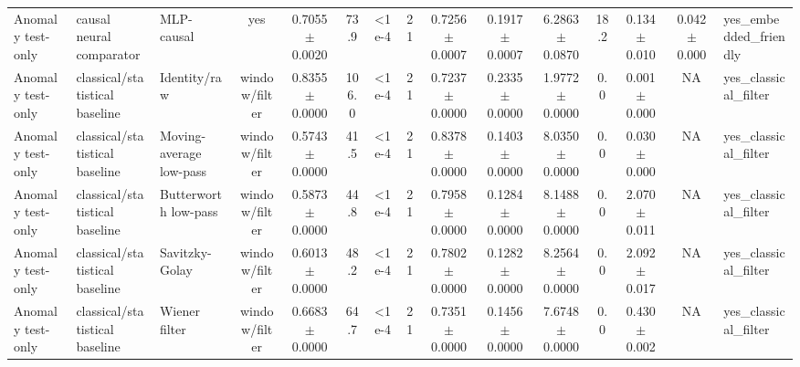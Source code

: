 \begin{table}[t]
{\begin{tabular}{lllcccccccccccl}
Anomaly test-only & causal neural comparator & MLP-causal & yes & 0.7055 $\pm$ 0.0020 & 73.9 & <1e-4 & 21 & 0.7256 $\pm$ 0.0007 & 0.1917 $\pm$ 0.0007 & 6.2863 $\pm$ 0.0870 & 18.2 & 0.134 $\pm$ 0.010 & 0.042 $\pm$ 0.000 & yes\_embedded\_friendly \\
Anomaly test-only & classical/statistical baseline & Identity/raw & window/filter & 0.8355 $\pm$ 0.0000 & 106.0 & <1e-4 & 21 & 0.7237 $\pm$ 0.0000 & 0.2335 $\pm$ 0.0000 & 1.9772 $\pm$ 0.0000 & 0.0 & 0.001 $\pm$ 0.000 & NA & yes\_classical\_filter \\
Anomaly test-only & classical/statistical baseline & Moving-average low-pass & window/filter & 0.5743 $\pm$ 0.0000 & 41.5 & <1e-4 & 21 & 0.8378 $\pm$ 0.0000 & 0.1403 $\pm$ 0.0000 & 8.0350 $\pm$ 0.0000 & 0.0 & 0.030 $\pm$ 0.000 & NA & yes\_classical\_filter \\
Anomaly test-only & classical/statistical baseline & Butterworth low-pass & window/filter & 0.5873 $\pm$ 0.0000 & 44.8 & <1e-4 & 21 & 0.7958 $\pm$ 0.0000 & 0.1284 $\pm$ 0.0000 & 8.1488 $\pm$ 0.0000 & 0.0 & 2.070 $\pm$ 0.011 & NA & yes\_classical\_filter \\
Anomaly test-only & classical/statistical baseline & Savitzky-Golay & window/filter & 0.6013 $\pm$ 0.0000 & 48.2 & <1e-4 & 21 & 0.7802 $\pm$ 0.0000 & 0.1282 $\pm$ 0.0000 & 8.2564 $\pm$ 0.0000 & 0.0 & 2.092 $\pm$ 0.017 & NA & yes\_classical\_filter \\
Anomaly test-only & classical/statistical baseline & Wiener filter & window/filter & 0.6683 $\pm$ 0.0000 & 64.7 & <1e-4 & 21 & 0.7351 $\pm$ 0.0000 & 0.1456 $\pm$ 0.0000 & 7.6748 $\pm$ 0.0000 & 0.0 & 0.430 $\pm$ 0.002 & NA & yes\_classical\_filter \\
\bottomrule
\end{tabular}%
}
\end{table}
